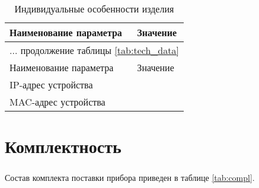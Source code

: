 \begin{longtable}{|p{8cm}|p{8cm}|}
	\caption{\label{tab:ind_data} Индивидуальные особенности изделия} \\
			
			\hline
	 		Наименование параметра & Значение  \\ 
	 		\hline
	 		\endfirsthead
	 		
	 		\multicolumn{2}{r}{... продолжение таблицы \ref{tab:tech_data}}\\ %
	 		\hline
	 		Наименование параметра & Значение  \\ 
	 		\hline
	 		\endhead
	 		
	 		IP-адрес устройства  &  \\ \hline
	 		
			MAC-адрес устройства & \\ \hline
			
\end{longtable}

\chapter{Комплектность}

\paragraph{} Состав комплекта поставки прибора приведен в таблице \ref{tab:compl}.

